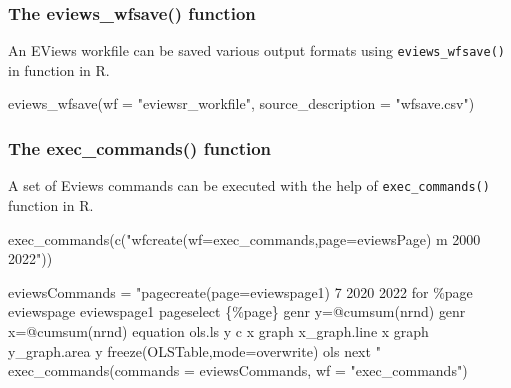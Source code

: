 \documentclass[
  letterpaper,
  DIV=11,
  numbers=noendperiod]{scrartcl}
\newenvironment{Shaded}{\begin{snugshade}}{\end{snugshade}}
\newcommand{\AttributeTok}[1]{\textcolor[rgb]{0.40,0.45,0.13}{#1}}
\newcommand{\FunctionTok}[1]{\textcolor[rgb]{0.28,0.35,0.67}{#1}}
\newcommand{\NormalTok}[1]{\textcolor[rgb]{0.00,0.23,0.31}{#1}}
\newcommand{\OtherTok}[1]{\textcolor[rgb]{0.00,0.23,0.31}{#1}}
\newcommand{\StringTok}[1]{\textcolor[rgb]{0.13,0.47,0.30}{#1}}
\begin{document}
\begin{figure}

\end{figure}

\hypertarget{the-eviews_wfsave-function}{%
\subsubsection{The eviews\_wfsave()
function}\label{the-eviews_wfsave-function}}

An EViews workfile can be saved various output formats using
\texttt{eviews\_wfsave()} in function in R.

\begin{Shaded}
\begin{Highlighting}[]
\FunctionTok{eviews\_wfsave}\NormalTok{(}\AttributeTok{wf =} \StringTok{"eviewsr\_workfile"}\NormalTok{, }\AttributeTok{source\_description =} \StringTok{"wfsave.csv"}\NormalTok{)}
\end{Highlighting}
\end{Shaded}

\begin{figure}

\end{figure}

\hypertarget{the-exec_commands-function}{%
\subsubsection{The exec\_commands()
function}\label{the-exec_commands-function}}

A set of Eviews commands can be executed with the help of
\texttt{exec\_commands()} function in R.

\begin{Shaded}
\begin{Highlighting}[]
\FunctionTok{exec\_commands}\NormalTok{(}\FunctionTok{c}\NormalTok{(}\StringTok{"wfcreate(wf=exec\_commands,page=eviewsPage) m 2000 2022"}\NormalTok{))}
\end{Highlighting}
\end{Shaded}

\begin{figure}

\end{figure}

\begin{Shaded}
\begin{Highlighting}[]
\NormalTok{eviewsCommands }\OtherTok{=} \StringTok{"pagecreate(page=eviewspage1) 7 2020 2022}
\StringTok{for \%page eviewspage eviewspage1}
\StringTok{pageselect \{\%page\}}
\StringTok{genr y=@cumsum(nrnd)}
\StringTok{genr x=@cumsum(nrnd)}
\StringTok{equation ols.ls y c x}
\StringTok{graph x\_graph.line x}
\StringTok{graph y\_graph.area y}
\StringTok{freeze(OLSTable,mode=overwrite) ols}
\StringTok{next}
\StringTok{"}
\FunctionTok{exec\_commands}\NormalTok{(}\AttributeTok{commands =}\NormalTok{ eviewsCommands, }\AttributeTok{wf =} \StringTok{"exec\_commands"}\NormalTok{)}
\end{Highlighting}
\end{Shaded}
\end{document}
